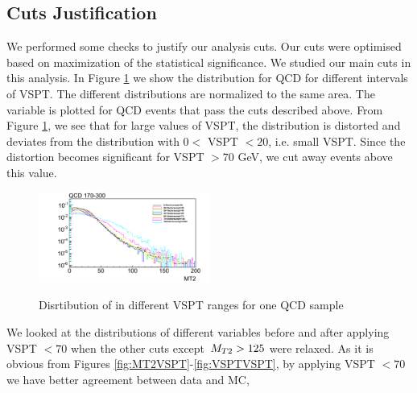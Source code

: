 \subsection{Cuts Justification}
We performed some checks to justify our analysis cuts. Our cuts were optimised based on maximization of the statistical significance. We studied our main cuts in this analysis.
In Figure \ref{fig:MT2diffVSPT} we show the \mttwo distribution for QCD for different intervals of VSPT. The different distributions 
are normalized to the same area. The variable is plotted for QCD events that
pass the cuts described above. From Figure \ref{fig:MT2diffVSPT}, we see that for
large values of VSPT, the \mttwo distribution is distorted and deviates from the distribution with
$0 <$ VSPT $<20$, i.e. small VSPT. Since the distortion becomes significant for VSPT $> 70$ GeV, we
cut away events above this value. 
\begin{figure}[!Hhtb]
\begin{center}
\includegraphics[angle=00,width=0.5\textwidth]{figs/MT2-diffVSPT-QCD170-300.png}\\
\end{center}
\caption{Disrtibution of \mttwo in different VSPT ranges for one QCD sample}
\label{fig:MT2diffVSPT}
\end{figure}
  
We looked at the distributions of different variables before and after applying VSPT $<70$ when the other cuts 
except $\,{M_{T2}} > 125 $ were relaxed. As it is obvious from Figures \ref{fig:MT2VSPT}-\ref{fig:VSPTVSPT}, by applying VSPT $<70$ we have better agreement 
between data and MC,

